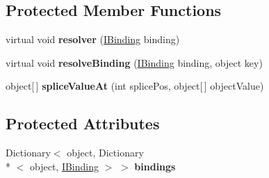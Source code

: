 \subsection*{Protected Member Functions}
\begin{DoxyCompactItemize}
\item 
\hypertarget{classbabel_1_1framework_1_1impl_1_1_binder_a1ea1dd1c007ec858e95d0bcf9bcf88b9}{virtual void {\bfseries resolver} (\hyperlink{interfacebabel_1_1framework_1_1api_1_1_i_binding}{I\-Binding} binding)}\label{classbabel_1_1framework_1_1impl_1_1_binder_a1ea1dd1c007ec858e95d0bcf9bcf88b9}

\item 
\hypertarget{classbabel_1_1framework_1_1impl_1_1_binder_adb6a147cf65b70bd7113126da8ea33b9}{virtual void {\bfseries resolve\-Binding} (\hyperlink{interfacebabel_1_1framework_1_1api_1_1_i_binding}{I\-Binding} binding, object key)}\label{classbabel_1_1framework_1_1impl_1_1_binder_adb6a147cf65b70bd7113126da8ea33b9}

\item 
\hypertarget{classbabel_1_1framework_1_1impl_1_1_binder_aa316495f1a5a3519c2b53742bd0f398e}{object\mbox{[}$\,$\mbox{]} {\bfseries splice\-Value\-At} (int splice\-Pos, object\mbox{[}$\,$\mbox{]} object\-Value)}\label{classbabel_1_1framework_1_1impl_1_1_binder_aa316495f1a5a3519c2b53742bd0f398e}

\end{DoxyCompactItemize}
\subsection*{Protected Attributes}
\begin{DoxyCompactItemize}
\item 
\hypertarget{classbabel_1_1framework_1_1impl_1_1_binder_a944c427748a15d73576398199104d3a1}{Dictionary$<$ object, Dictionary\\*
$<$ object, \hyperlink{interfacebabel_1_1framework_1_1api_1_1_i_binding}{I\-Binding} $>$ $>$ {\bfseries bindings}}\label{classbabel_1_1framework_1_1impl_1_1_binder_a944c427748a15d73576398199104d3a1}

\end{DoxyCompactItemize}


